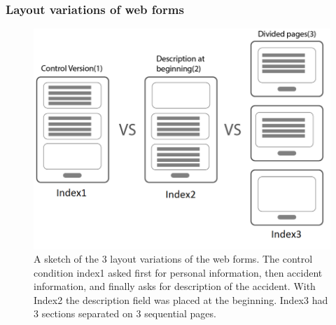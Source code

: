 \documentclass[../main/Feedback.tex]{subfiles}
\begin{document}
\subsubsection{Layout variations of web forms}
\begin{figure}
	\centering
	\includegraphics[width=0.86\linewidth]{../figures/layout-variations}
	\caption[Sketch of layout variations of the web forms]{A sketch of the 3 layout variations of the web forms. The control condition index1 asked first for personal information, then accident information, and finally asks for description of the accident. With Index2 the description field was placed at the beginning. Index3 had 3 sections separated on 3 sequential pages.}
	\label{fig:layout-variations}
\end{figure}
\end{document}
